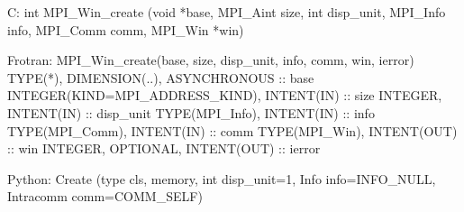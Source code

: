C:
int MPI_Win_create
   (void *base, MPI_Aint size, int disp_unit,
    MPI_Info info, MPI_Comm comm, MPI_Win *win)

Frotran:
MPI_Win_create(base, size, disp_unit, info, comm, win, ierror)
TYPE(*), DIMENSION(..), ASYNCHRONOUS :: base
INTEGER(KIND=MPI_ADDRESS_KIND), INTENT(IN) :: size
INTEGER, INTENT(IN) :: disp_unit
TYPE(MPI_Info), INTENT(IN) :: info
TYPE(MPI_Comm), INTENT(IN) :: comm
TYPE(MPI_Win), INTENT(OUT) :: win
INTEGER, OPTIONAL, INTENT(OUT) :: ierror

Python:
Create
   (type cls, memory, int disp_unit=1,
    Info info=INFO_NULL, Intracomm comm=COMM_SELF)

